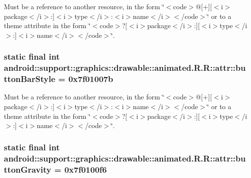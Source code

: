 Must be a reference to another resource, in the form \char`\"{}$<$code$>$@\mbox{[}+\mbox{]}\mbox{[}$<$i$>$package$<$/i$>$:\mbox{]}$<$i$>$type$<$/i$>$:$<$i$>$name$<$/i$>$$<$/code$>$\char`\"{} or to a theme attribute in the form \char`\"{}$<$code$>$?\mbox{[}$<$i$>$package$<$/i$>$:\mbox{]}\mbox{[}$<$i$>$type$<$/i$>$:\mbox{]}$<$i$>$name$<$/i$>$$<$/code$>$\char`\"{}. \hypertarget{classandroid_1_1support_1_1graphics_1_1drawable_1_1animated_1_1_r_1_1attr_84d50dbc0ae00f723d926436297c8899}{
\subsubsection[{buttonBarStyle}]{\setlength{\rightskip}{0pt plus 5cm}static final int android::support::graphics::drawable::animated.R.R::attr::buttonBarStyle = 0x7f01007b}}
\label{classandroid_1_1support_1_1graphics_1_1drawable_1_1animated_1_1_r_1_1attr_84d50dbc0ae00f723d926436297c8899}


Must be a reference to another resource, in the form \char`\"{}$<$code$>$@\mbox{[}+\mbox{]}\mbox{[}$<$i$>$package$<$/i$>$:\mbox{]}$<$i$>$type$<$/i$>$:$<$i$>$name$<$/i$>$$<$/code$>$\char`\"{} or to a theme attribute in the form \char`\"{}$<$code$>$?\mbox{[}$<$i$>$package$<$/i$>$:\mbox{]}\mbox{[}$<$i$>$type$<$/i$>$:\mbox{]}$<$i$>$name$<$/i$>$$<$/code$>$\char`\"{}. \hypertarget{classandroid_1_1support_1_1graphics_1_1drawable_1_1animated_1_1_r_1_1attr_7fce8a84e8680e42a603541a4f7a39c5}{
\subsubsection[{buttonGravity}]{\setlength{\rightskip}{0pt plus 5cm}static final int android::support::graphics::drawable::animated.R.R::attr::buttonGravity = 0x7f0100f6}}
\label{classandroid_1_1support_1_1graphics_1_1drawable_1_1animated_1_1_r_1_1attr_7fce8a84e8680e42a603541a4f7a39c5}


